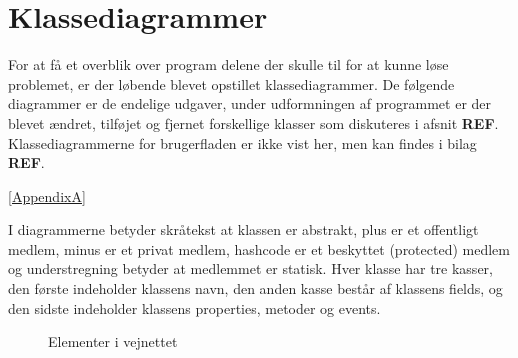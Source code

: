 \section{Klassediagrammer}\label{Klassediagrammer}

For at få et overblik over program delene der skulle til for at kunne løse problemet, er der løbende blevet opstillet klassediagrammer. De følgende diagrammer er de endelige udgaver, under udformningen af programmet er der blevet ændret, tilføjet og fjernet forskellige klasser som diskuteres i afsnit \textbf{REF}. Klassediagrammerne for brugerfladen er ikke vist her, men kan findes i bilag \textbf{REF}.

\ref{AppendixA}

\vspace{5mm}

I diagrammerne betyder skråtekst at klassen er abstrakt, plus er et offentligt medlem, minus er et privat medlem, hashcode er et beskyttet (protected) medlem og understregning betyder at medlemmet er statisk. Hver klasse har tre kasser, den første indeholder klassens navn, den anden kasse består af klassens fields, og den sidste indeholder klassens properties, metoder og events.

\begin{figure}[H]
    \centering
    \caption{Elementer i vejnettet}
    \label{kdVejElementer}
\end{figure}

